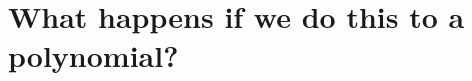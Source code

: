 \documentclass{ximera}
\begin{document}
\begin{question}
\begin{solution}
\begin{hint}
                \end{hint}


              \begin{multiple-choice}

              \end{multiple-choice}

              \end{solution}
            \end{question}
            

\section{What happens if we do this to a polynomial?}
\end{document}
